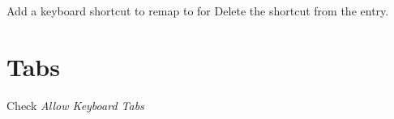 \documentclass{lebook}
\begin{document}
Add a keyboard shortcut to remap  to  for 
Delete the  shortcut from the  entry.

	\section{Tabs}
    \begin{numberedlist}
    	\item {}
    	\item Check \textit{Allow Keyboard Tabs}
    \end{numberedlist}

	
\end{document}
